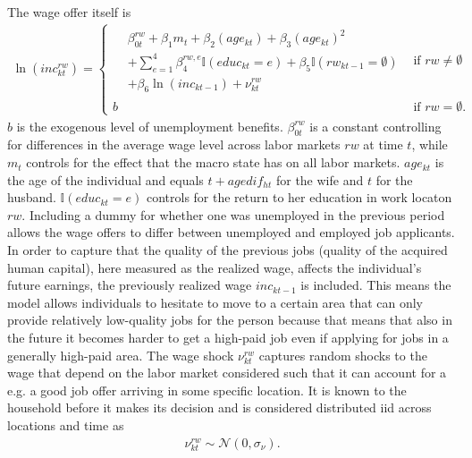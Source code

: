 The wage offer itself is 
\begin{align}
\ln(inc_{kt}^{rw}) = 
\begin{cases} 
    \!\begin{aligned}%
       & \beta_{0t}^{rw} + \beta_1 m_t + \beta_2 (age_{kt}) + \beta_3(age_{kt})^2 \\
       & + \sum_{e=1}^{4}{\beta_4^{rw,e} \mathbb{I}{(educ_{kt}=e)}} + \beta_5\mathbb{I}{(rw_{kt-1}=\emptyset)} \\
       & +\beta_6 \ln(inc_{kt-1})+\nu_{kt}^{rw}
    \end{aligned}           &  \text{if } rw\neq\emptyset \\%
    b & \text{if } rw=\emptyset. 
\end{cases}
\label{eq:inc}
\end{align}
$b$ is the exogenous level of unemployment benefits. $\beta_{0t}^{rw}$ is a constant controlling for differences in the average wage level across labor markets $rw$ at time $t$, while $m_t$ controls for the effect that the macro state has on all labor markets. $age_{kt}$ is the age of the individual and equals $t+agedif_{ht}$ for the wife and $t$ for the husband. $\mathbb{I}{(educ_{kt}=e)}$ controls for the return to her education in work locaton $rw$. Including a dummy for whether one was unemployed in the previous period allows the wage offers to differ between unemployed and employed job applicants. In order to capture that the quality of the previous jobs (quality of the acquired human capital), here measured as the realized wage, affects the individual's future earnings, the previously realized wage $inc_{kt-1}$ is included. This means the model allows individuals to hesitate to move to a certain area that can only provide relatively low-quality jobs for the person because that means that also in the future it becomes harder to get a high-paid job even if applying for jobs in a generally high-paid area. The wage shock $\nu_{kt}^{rw}$ captures random shocks to the wage that depend on the labor market considered such that it can account for a e.g. a good job offer arriving in some specific location. It is known to the household before it makes its decision and is considered distributed iid across locations and time as 
\begin{align*}
\nu_{kt}^{rw} \sim \mathcal{N}(0,\sigma_{\nu}).
\end{align*}



